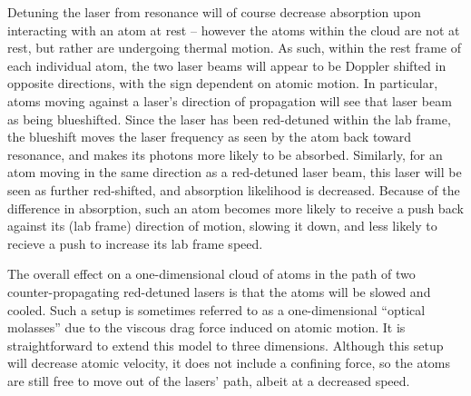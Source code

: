 Detuning the laser from resonance will of course decrease absorption upon interacting with an atom at rest -- however the atoms within the cloud are not at rest, but rather are undergoing thermal motion.  As such, within the rest frame of each individual atom, the two laser beams will appear to be Doppler shifted in opposite directions, with the sign dependent on atomic motion.  In particular, atoms moving against a laser's direction of propagation will see that laser beam as being blueshifted.  Since the laser has been red-detuned within the lab frame, the blueshift moves the laser frequency as seen by the atom back toward resonance, and makes its photons more likely to be absorbed.  Similarly, for an atom moving in the same direction as a red-detuned laser beam, this laser will be seen as further red-shifted, and absorption likelihood is decreased.  Because of the difference in absorption, such an atom becomes more likely to receive a push back against its (lab frame) direction of motion, slowing it down, and less likely to recieve a push to increase its lab frame speed.   

The overall effect on a one-dimensional cloud of atoms in the path of two counter-propagating red-detuned lasers is that the atoms will be slowed and cooled.  Such a setup is sometimes referred to as a one-dimensional ``optical molasses'' due to the viscous drag force induced on atomic motion.  It is straightforward to extend this model to three dimensions.  Although this setup will decrease atomic velocity, it does not include a confining force, so the atoms are still free to move out of the lasers' path, albeit at a decreased speed.  





